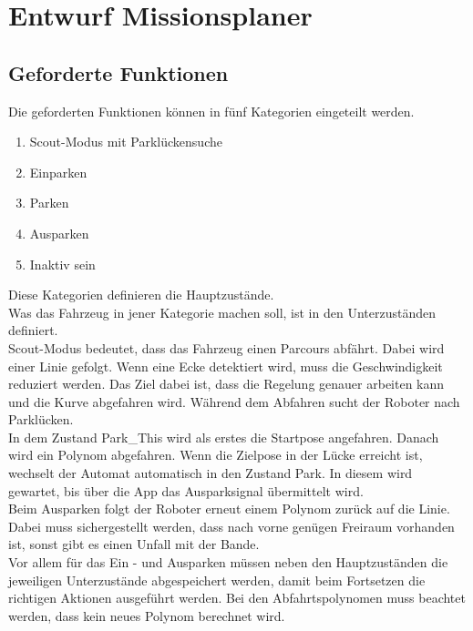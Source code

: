 \chapter{Entwurf Missionsplaner}

\section{Geforderte Funktionen}

Die geforderten Funktionen können in fünf Kategorien eingeteilt werden.
\renewcommand{\labelenumi}{\roman{enumi}}
\begin{enumerate}
\item 	Scout-Modus mit Parklückensuche
\item 	Einparken
\item	Parken
\item	Ausparken
\item	Inaktiv sein
\end{enumerate}

\noindent Diese Kategorien definieren die Hauptzustände.\\

\noindent Was das Fahrzeug in jener Kategorie machen soll, ist in den Unterzuständen definiert.\\


\noindent Scout-Modus bedeutet, dass das Fahrzeug einen Parcours abfährt. Dabei wird einer Linie gefolgt. Wenn eine Ecke detektiert wird, muss die Geschwindigkeit reduziert werden. Das Ziel dabei ist, dass die Regelung genauer arbeiten kann und die Kurve abgefahren wird. Während dem Abfahren sucht der Roboter nach Parklücken.\\

\noindent In dem Zustand \glqq Park\_This\grqq{} wird als erstes die Startpose angefahren. Danach wird ein Polynom abgefahren. Wenn die Zielpose in der Lücke erreicht ist, wechselt der Automat automatisch in den Zustand \glqq Park\grqq{}. In diesem wird gewartet, bis über die App das Ausparksignal übermittelt wird.\\

\noindent Beim Ausparken folgt der Roboter erneut einem Polynom zurück auf die Linie. Dabei muss sichergestellt werden, dass nach vorne genügen Freiraum vorhanden ist, sonst gibt es einen Unfall mit der Bande.\\

\noindent Vor allem für das Ein - und Ausparken müssen neben den Hauptzuständen die jeweiligen Unterzustände abgespeichert werden, damit beim Fortsetzen die richtigen Aktionen ausgeführt werden. Bei den Abfahrtspolynomen muss beachtet werden, dass kein neues Polynom berechnet wird. 



